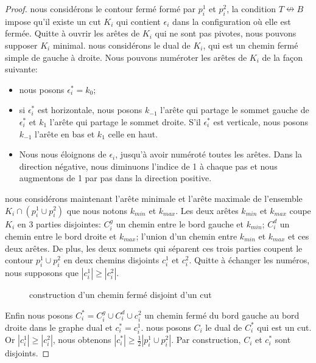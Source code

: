 \documentclass[titlepage,a4paper,12pt]{article}
\newcommand{\nconnect}{\nleftrightarrow}
\begin{document}
\begin{proof}
nous considérons le contour fermé formé par $p_i^1$ et $p_i^2$, la condition $T\nconnect B$ impose qu'il existe un cut $K_i$ qui contient $\epsilon_i$ dans la configuration où elle est fermée. Quitte à ouvrir les arêtes de $K_i$ qui ne sont pas pivotes, nous pouvons supposer $K_i$ minimal. nous considérons le dual de $K_i$, qui est un chemin fermé simple de gauche à droite. Nous pouvons numéroter les arêtes de $K_i$ de la façon suivante:
\begin{itemize}
\item nous posons $\epsilon^*_i = k_0$;
\item si $\epsilon^*_i$ est horizontale, nous posons $k_{-1}$ l'arête qui partage le sommet gauche de $\epsilon^*_i$ et $k_1$ l'arête qui partage le sommet droite. S'il $\epsilon_i^*$ est verticale, nous posons $k_{-1}$ l'arête en bas et $k_1$ celle en haut.
\item Nous nous éloignons de $\epsilon_i$, jusqu'à avoir numéroté toutes les arêtes. Dans la direction négative, nous diminuons l'indice de 1 à chaque pas et nous augmentons de 1 par pas dans la direction positive.
\end{itemize}

nous considérons maintenant l'arête minimale et l'arête maximale de l'ensemble $K_i\cap (p_i^1\cup p_i^2)$ que nous notons $k_{min}$ et $k_{max}$. Les deux arêtes $k_{min}$ et $k_{max}$ coupe $K_i$ en 3 parties disjointes: $C^g_i$ un chemin entre le bord gauche et $k_{min}$; $C^d_i$ un chemin entre le bord droite et $k_{max}$; l'union d'un chemin entre $k_{min}$ et $k_{max}$ et ces deux arêtes. De plus, les deux sommets qui séparent ces trois parties coupent le contour $p_i^1\cup p_i^2$ en deux chemins disjoints $c_i^1$ et $c_i^2$. Quitte à échanger les numéros, nous supposons que $|c_i^1| \geqslant |c_i^2|$.
\begin{figure}[h]
\center
{}
\caption{construction d'un chemin fermé disjoint d'un cut}
\end{figure}

Enfin nous posons $C^*_i = C^g_i \cup C^d_i \cup c_i^2$ un chemin fermé du bord gauche au bord droite dans le graphe dual et $c_i^* = c_i^1$. nous posons $C_i$ le dual de $C^*_i$ qui est un cut. Or $|c_i^1| \geqslant |c_i^2|$, nous obtenons $|c^*_i| \geqslant \frac{1}{2}|p_i^1\cup p_i^2|$. Par construction, $C_i$ et $c_i^*$ sont disjoints.
\end{proof}
\end{document}
